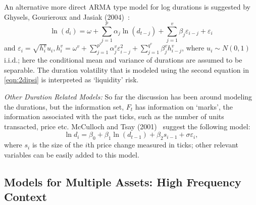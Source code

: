 An alternative more direct ARMA type model for log durations is suggested by Ghysels, Gourieroux and Jasiak (2004)~\cite{jasiak}:
        \begin{equation} \label{eqn:21lnd}
        	\ln{(d_i)} = \omega + \sum_{j=1}^p \alpha_j \ln{(d_{t-j})} + \sum_{j=1}^v \beta_j \varepsilon_{i-j} + \varepsilon_i
        \end{equation}
and $\varepsilon_i = \sqrt{h_i^v} u_i, h_i^v = \omega^v + \sum_{j=1}^{p^v} \alpha_j^v \varepsilon_{i-j}^2 + \sum_{j=1}^{q^v} \beta_j^v h_{i-j}^v$, where $u_i \sim N(0,1)$ i.i.d.; here the conditional mean and variance of durations are assumed to be separable. The duration volatility that is modeled using the second equation in \eqref{eqn:2dipsi} is interpreted as `liquidity' risk. \twomedskip


\noindent \emph{Other Duration Related Models:} So far the discussion has been around modeling the durations, but the information set, $F_t$ has information on `marks', the information associated with the past ticks, such as the number of units transacted, price etc. McCulloch and Tsay (2001)~\cite{mccullochtsay07} suggest the following model:
	\begin{equation} \label{eqn:2lndi}
	\ln{d_i} = \beta_0 + \beta_1 \ln{(d_{t-1})} + \beta_2s_{i-1} + \sigma\varepsilon_i,
	\end{equation}
where $s_i$ is the size of the $i$th price change measured in ticks; other relevant variables can be easily added to this model.



\subsection{Models for Multiple Assets: High Frequency Context}


